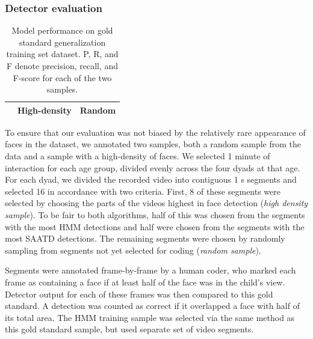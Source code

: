\documentclass[a4paper,man,apacite,floatsintext,longtable]{apa6}
\begin{document}
\subsubsection{Detector evaluation}\label{detector-evaluation}

\begin{table}[t]
  \caption{Model performance on gold standard generalization training set dataset. P, R, and F denote precision, recall, and F-score for each of the two samples. \label{tab:model_eval}}
  \begin{center}
    \begin{tabular}{l|ccc|ccc}
      \hline
       &  \multicolumn{3}{c|}{High-density} &  \multicolumn{3}{c}{Random} \\
      \hline
    \hline
    \end{tabular}
  \end{center}
\end{table}

To ensure that our evaluation was not biased by the relatively rare
appearance of faces in the dataset, we annotated two samples, both a
random sample from the data and a sample with a high-density of faces.
We selected 1 minute of interaction for each age group, divided evenly
across the four dyads at that age. For each dyad, we divided the
recorded video into contiguous 1 s segments and selected 16 in
accordance with two criteria. First, 8 of these segments were selected
by choosing the parts of the videos highest in face detection
(\emph{high density sample}). To be fair to both algorithms, half of
this was chosen from the segments with the most HMM detections and half
were chosen from the segments with the most SAATD detections. The
remaining segments were chosen by randomly sampling from segments not
yet selected for coding (\emph{random sample}).

Segments were annotated frame-by-frame by a human coder, who marked each
frame as containing a face if at least half of the face was in the
child's view. Detector output for each of these frames was then compared
to this gold standard. A detection was counted as correct if it
overlapped a face with half of its total area. The HMM training sample
was selected via the same method as this gold standard sample, but used
separate set of video segments.
\end{document}
